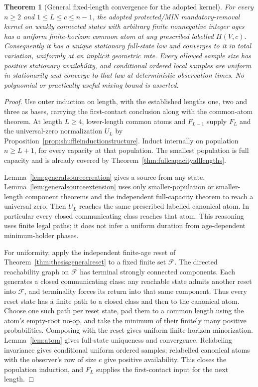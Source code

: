 \documentclass[11pt]{article}
\newtheorem{theorem}{Theorem}
\begin{document}
\begin{theorem}[General fixed-length convergence for the adopted kernel]
\label{thm:allparametersuniform}
For every $n\ge2$ and $1\le L\le c\le n-1$, the adopted
protected/MIN mandatory-removal kernel on weakly connected states
with arbitrary finite nonnegative integer ages has a uniform
finite-horizon common atom at any prescribed labelled $H(V,c)$.
Consequently it has a unique stationary full-state law and converges
to it in total variation, uniformly at an implicit geometric rate.
Every allowed sample size has positive stationary availability, and
conditional ordered local samples are uniform in stationarity and
converge to that law at deterministic observation times.
No polynomial or practically useful mixing bound is asserted.
\end{theorem}
\begin{proof}
Use outer induction on length, with the established lengths one,
two and three as bases, carrying the first-contact conclusion along
with the common-atom theorem. At length $L\ge4$, lower-length
common atoms and $F_{L-1}$ supply $F_L$ and the universal-zero
normalization $U_L$ by
Proposition~\ref{prop:shuffleinductionstructure}. Induct internally
on population $n\ge L+1$, for every capacity at that population.
The smallest population is full capacity and is already covered by
Theorem~\ref{thm:fullcapacityalllengths}.

Lemma~\ref{lem:generalsourcecreation} gives a source from any state.
Lemma~\ref{lem:generalsourceextension} uses only smaller-population
or smaller-length component theorems and the independent
full-capacity theorem to reach a universal zero. Then $U_L$
reaches the same prescribed labelled canonical atom. In particular
every closed communicating class reaches that atom. This reasoning
uses finite legal paths; it does not infer a uniform duration from
age-dependent minimum-holder phases.

For uniformity, apply the independent finite-age reset of
Theorem~\ref{thm:thesisgeneralreset} to a fixed finite set $\mathcal F$.
The directed reachability graph on $\mathcal F$ has terminal strongly
connected components. Each generates a closed communicating class:
any reachable state admits another reset into $\mathcal F$, and
terminality forces its return into that same component. Thus every
reset state has a finite path to a closed class and then to the
canonical atom. Choose one such path per reset state, pad them to
a common length using the atom's empty-root no-op, and take the
minimum of their finitely many positive probabilities. Composing
with the reset gives uniform finite-horizon minorization.
Lemma~\ref{lem:atom} gives full-state uniqueness and convergence.
Relabeling invariance gives conditional uniform ordered samples;
relabelled canonical atoms with the observer's row of size $c$
give positive availability. This closes the population induction,
and $F_L$ supplies the first-contact input for the next length.
\end{proof}
\end{document}
